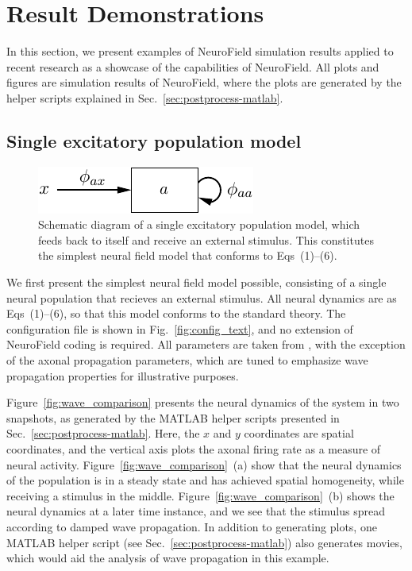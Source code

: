 \documentclass[preprint,review,10pt,authoryear,letterpaper]{elsarticle}
\begin{document}
\section{Result Demonstrations}
\label{sec:results}

In this section, we present examples of NeuroField simulation results applied to recent research as a showcase of the capabilities of NeuroField. All plots and figures are simulation results of NeuroField, where the plots are generated by the helper scripts explained in Sec.~\ref{sec:postprocess-matlab}.

\subsection{Single excitatory population model}
\label{sec:wave}

\begin{figure}[t]
\begin{center}
\includegraphics[width=0.50\columnwidth]{one-pop}
\caption{Schematic diagram of a single excitatory population model, which feeds back to itself and receive an external stimulus. This constitutes the simplest neural field model that conforms to Eqs~(1)--(6).}
\label{fig:single}
\end{center}
\end{figure}

We first present the simplest neural field model possible, consisting of a single neural population that recieves an external stimulus. All neural dynamics are as Eqs~(1)--(6), so that this model conforms to the standard \citet{Robinson2005} theory. The configuration file is shown in Fig.~\ref{fig:config_text}, and no extension of NeuroField coding is required. All parameters are taken from \citet{Robinson:04aa}, with the exception of the axonal propagation parameters, which are tuned to emphasize wave propagation properties for illustrative purposes.

Figure~\ref{fig:wave_comparison} presents the neural dynamics of the system in two snapshots, as generated by the MATLAB helper scripts presented in Sec.~\ref{sec:postprocess-matlab}. Here, the \(x\) and \(y\) coordinates are spatial coordinates, and the vertical axis plots the axonal firing rate as a measure of neural activity. Figure~\ref{fig:wave_comparison}~(a) show that the neural dynamics of the population is in a steady state and has achieved spatial homogeneity, while receiving a stimulus in the middle. Figure~\ref{fig:wave_comparison}~(b) shows the neural dynamics at a later time instance, and we see that the stimulus spread according to damped wave propagation. In addition to generating plots, one MATLAB helper script (see Sec.~\ref{sec:postprocess-matlab}) also generates movies, which would aid the analysis of wave propagation in this example.
\end{document}

